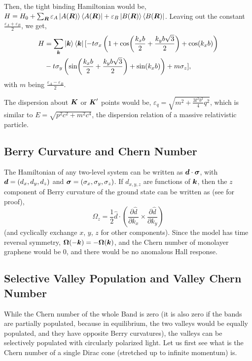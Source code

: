 \documentclass{report}
\renewcommand\vec[1]{\ensuremath\boldsymbol{#1}} %
\begin{document}
Then, the tight binding Hamiltonian would be,
$H = H_0 + \sum_{\vec{R}} \varepsilon_A \ket{A(\vec{R})} \bra{A(\vec{R})} + \varepsilon_B \ket{B(\vec{R})} \bra{B(\vec{R})}$. Leaving out the constant  $\frac{\varepsilon_A + \varepsilon_B}{2}$, we get,
\begin{equation}\label{Eq:GrapheneHopping}
	\begin{aligned}
H &=  \sum_{\vec{k}} \ket{\vec{k}}\bra{\vec{k}} [-t \sigma_x \left(1 + \cos(\frac{k_x b}{2} + \frac{k_y b \sqrt{3}}{2}) + \cos(k_x b)\right) \\
& -t \sigma_y \left( \sin(\frac{k_x b}{2}  + \frac{k_y b \sqrt{3}}{2}) + \sin(k_x b)\right)  + m \sigma_z ],
	\end{aligned}
\end{equation} with $m$ being $\frac{\varepsilon_A - \varepsilon_B}{2}$.

The dispersion about $\vec{K}$ or $\vec{K}'$ points would be, $\varepsilon_{q} = \sqrt{m^2 + \frac{3 t^2 b^2}{4} q^2} $, which is similar to $E = \sqrt{p^2 c^2 + m^2 c^4}$, the dispersion relation of a massive relativistic particle.

\subsection{Berry Curvature and Chern Number}
The Hamiltonian of any two-level system can be written as $\vec{d} \cdot \vec{\sigma}$, with $\vec{d} = (d_x, d_y, d_z)$ and $\vec{\sigma} = (\sigma_x, \sigma_y, \sigma_z)$. If $d_{x,y,z}$ are functions of $\vec{k}$, then the $z$ component of Berry curvature of the ground state can be written as (see \cite{shankar2018topological} for proof),
\begin{equation}\label{Eq:BerryTwoBandFormula}
	\Omega_z = 
	\frac{1}{2} \hat{d} \cdot \left(\frac{\partial \hat{d}}{\partial k_x} \times \frac{\partial \hat{d}}{\partial k_y} \right)
\end{equation}
(and cyclically exchange $x$, $y$, $z$ for other components).
Since the model has time reversal symmetry, $\vec{\Omega}(-\vec{k}) = -\vec{\Omega}(\vec{k})$, and the Chern number of monolayer graphene would be $0$, and there would be no anomalous Hall response.
\subsection{Selective Valley Population and Valley Chern Number}
While the Chern number of the whole Band is zero (it is also zero if the bands are partially populated, because in equilibrium, the two valleys would be equally populated, and they have opposite Berry curvatures), the valleys can be selectively populated \cite{valleyPolBilayerGraphene} with circularly polarized light.
Let us first see what is the Chern number of a single Dirac cone (stretched up to infinite momentum) is.
\end{document}
